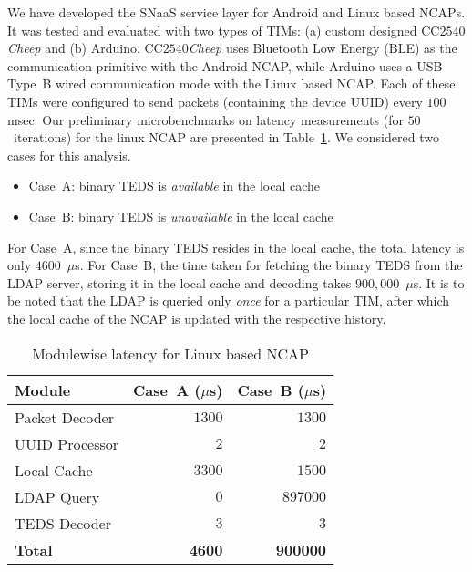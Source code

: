 \documentclass[conference]{IEEEtran}
\begin{document}
We have developed the SNaaS service layer for Android and Linux based NCAPs.
It was tested and evaluated with two types of TIMs: (a) custom designed CC$2540$\emph{Cheep} and (b) Arduino.
CC$2540$\emph{Cheep} uses Bluetooth Low Energy (BLE) as the communication primitive with the Android NCAP, while Arduino uses a USB Type~B wired communication mode with the Linux based NCAP.
Each of these TIMs were configured to send packets (containing the device UUID) every $100$\,msec.
\newline
\indent
Our preliminary microbenchmarks on latency measurements (for $50$~iterations) for the linux NCAP are presented in Table~\ref{tab:p1}. 
We considered two cases for this analysis.
\begin{itemize}
	\item Case~A: binary TEDS is \emph{available} in the local cache
	\item Case~B: binary TEDS is \emph{unavailable} in the local cache	
\end{itemize}
For Case~A, since the binary TEDS resides in the local cache, the total latency is only $4600$~$\mu$s.
For Case~B, the time taken for fetching the binary TEDS from the LDAP server, storing it in the local cache and decoding takes $900,000$~$\mu$s. 
It is to be noted that the LDAP is queried only \emph{once} for a particular TIM, after which the local cache of the NCAP is updated with the respective history. 

\begin{table}[t]
\begin{center}
\caption {Modulewise latency for Linux based NCAP} 
\label{tab:p1}
\normalsize
\begin{tabular}{lrr}
\toprule
\textbf{Module}  &  \textbf{Case~A ($\mu$s)}  &  \textbf{Case~B ($\mu$s)}\\
\midrule
Packet Decoder & $1300$ & $1300$ \\ 
UUID Processor & $2$ & $2$ \\ 
Local Cache & $3300$  & $1500$  \\ 
LDAP Query & $0$  & $897000$  \\ 
TEDS Decoder & $3$   & $3$  \\ 
\midrule
\textbf{Total} & \textbf{4600} & \textbf{900000} \\ 
\bottomrule
\end{tabular}
\end{center}
\vspace{5mm}
\end{table}
\end{document}
